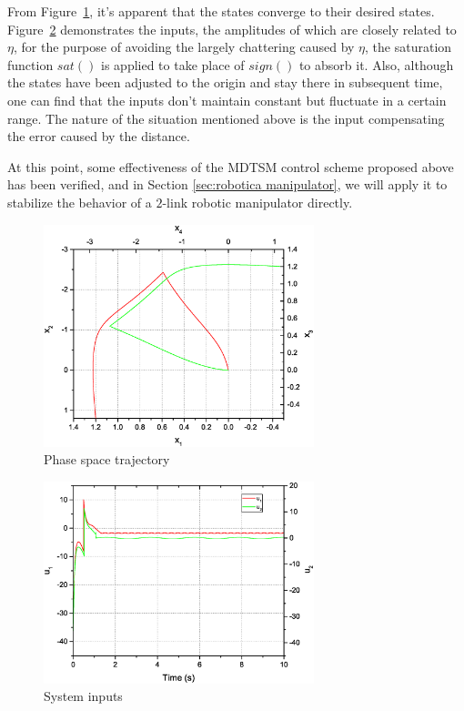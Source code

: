 \documentclass[3p]{elsarticle}
\theoremstyle{plain}
\theoremstyle{remark}
\begin{document}
From Figure~\ref{Figure:2}, it's apparent that the states converge to their desired states. Figure~\ref{Figure:3} demonstrates the inputs, the amplitudes of which are closely related to $\eta$, for the purpose of avoiding the largely chattering caused by $\eta$, the saturation function $sat()$ is applied to take place of $sign()$ to absorb it. Also, although the states have been adjusted to the origin and stay there in subsequent time, one can find that the inputs don't maintain constant but fluctuate in a certain range. The nature of the situation mentioned above is the input compensating the error caused by the distance.\par
At this point, some effectiveness of the MDTSM control scheme proposed above has been verified, and in Section \ref{sec:robotica manipulator}, we will apply it to stabilize the behavior of a $2$-link robotic manipulator directly.
\begin{figure}
\centering
\includegraphics[width=0.7\textwidth]{paper3_fig2.eps}
\caption{Phase space trajectory}
\label{Figure:2}
\end{figure}

\begin{figure}
\centering
\includegraphics[width=0.7\textwidth]{paper3_fig3.eps}
\caption{System inputs}
\label{Figure:3}
\end{figure}
\end{document}
